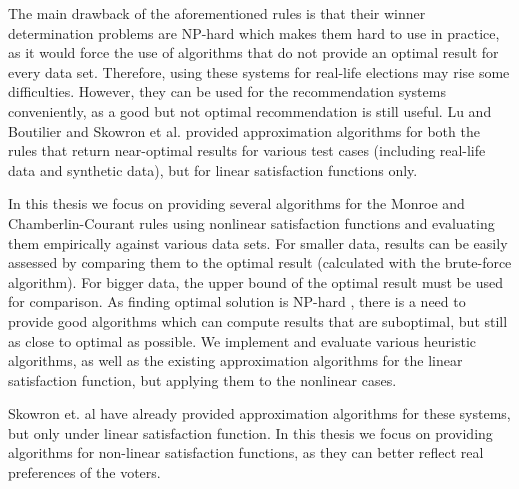 The main drawback of the aforementioned rules is that their winner determination problems are NP-hard \cite{3, 4, 2} which makes them hard to use in practice, as it would force the use of algorithms that do not provide an optimal result for every data set. Therefore, using these systems for real-life elections may rise some difficulties. However, they can be used for the recommendation systems conveniently, as a good but not optimal recommendation is still useful. Lu and Boutilier \cite{4} and Skowron et al. \cite{1} provided approximation algorithms for both the rules that return near-optimal results for various test cases (including real-life data and synthetic data), but for linear satisfaction functions only.

In this thesis we focus on providing several algorithms for the Monroe and Chamberlin-Courant rules using nonlinear satisfaction functions and evaluating them empirically against various data sets. For smaller data, results can be easily assessed by comparing them to the optimal result (calculated with the brute-force algorithm). For bigger data, the upper bound of the optimal result must be used for comparison. As finding optimal solution is NP-hard \cite{3, 4, 2}, there is a need to provide good algorithms which can compute results that are suboptimal, but still as close to optimal as possible. We implement and evaluate various heuristic algorithms, as well as the existing approximation algorithms for the linear satisfaction function, but applying them to the nonlinear cases.

Skowron et. al \cite{1} have already provided approximation algorithms for these systems, but only under linear satisfaction function. In this thesis we focus on providing algorithms for non-linear satisfaction functions, as they can better reflect real preferences of the voters.
